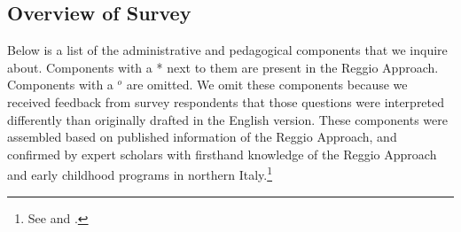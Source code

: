 

\subsection{Overview of Survey} \label{sec:survey-overview}
Below is a list of the administrative and pedagogical components that we inquire about. Components with a * next to them are present in the Reggio Approach. Components with a $^o$ are omitted. We omit these components because we received feedback from survey respondents that those questions were interpreted differently than originally drafted in the English version. These components were assembled based on published information of the Reggio Approach, and confirmed by expert scholars with firsthand knowledge of the Reggio Approach and early childhood programs in northern Italy.\footnote{See \citet{Edwards-etal-eds_1998_Hundred-Languages} and \citet{Corsaro_2008_Policy-Practice}.}

